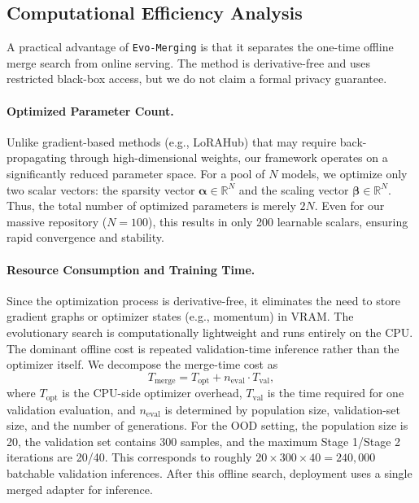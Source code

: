 \subsection{Computational Efficiency Analysis}
A practical advantage of \texttt{Evo-Merging} is that it separates the one-time offline merge search from online serving. The method is derivative-free and uses restricted black-box access, but we do not claim a formal privacy guarantee.

\paragraph{Optimized Parameter Count.} 
Unlike gradient-based methods (e.g., LoRAHub) that may require back-propagating through high-dimensional weights, our framework operates on a significantly reduced parameter space. For a pool of $N$ models, we optimize only two scalar vectors: the sparsity vector $\bm{\alpha} \in \mathbb{R}^N$ and the scaling vector $\bm{\beta} \in \mathbb{R}^N$. Thus, the total number of optimized parameters is merely $2N$. Even for our massive repository ($N=100$), this results in only 200 learnable scalars, ensuring rapid convergence and stability.

\paragraph{Resource Consumption and Training Time.} 
Since the optimization process is derivative-free, it eliminates the need to store gradient graphs or optimizer states (e.g., momentum) in VRAM. The evolutionary search is computationally lightweight and runs entirely on the CPU. The dominant offline cost is repeated validation-time inference rather than the optimizer itself. We decompose the merge-time cost as
\begin{equation}
T_{\mathrm{merge}} = T_{\mathrm{opt}} + n_{\mathrm{eval}} \cdot T_{\mathrm{val}},
\end{equation}
where $T_{\mathrm{opt}}$ is the CPU-side optimizer overhead, $T_{\mathrm{val}}$ is the time required for one validation evaluation, and $n_{\mathrm{eval}}$ is determined by population size, validation-set size, and the number of generations. For the OOD setting, the population size is 20, the validation set contains 300 samples, and the maximum Stage 1/Stage 2 iterations are 20/40. This corresponds to roughly $20 \times 300 \times 40 = 240{,}000$ batchable validation inferences. After this offline search, deployment uses a single merged adapter for inference.


